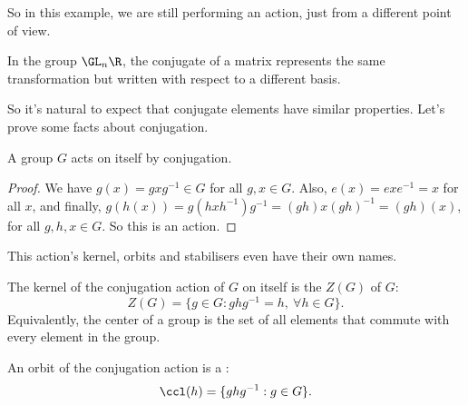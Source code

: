 \begin{example}
\begin{center}

	\end{center}
	So in this example, we are still performing an action, just from a different point of view.
\end{example}

\begin{example}
	In the group $\GL_n \R$, the conjugate of a matrix represents the same transformation but written with respect to a different basis.
\end{example}

So it's natural to expect that conjugate elements have similar properties. Let's prove some facts about conjugation.

\begin{proposition}
	A group $G$ acts on itself by conjugation.
\end{proposition}
\begin{proof}
	We have $g(x) = gxg^{-1} \in G$ for all $g, x \in G$. Also, $e(x) = e x e^{-1} = x$ for all $x$, and finally, $g(h(x)) = g(h xh^{-1})g^{-1} = (gh) x (gh)^{-1} = (gh)(x)$, for all $g, h, x \in G$. So this is an action.
\end{proof}

This action's kernel, orbits and stabilisers even have their own names.

\begin{definition}[Center]
	The kernel of the conjugation action of $G$ on itself is the  $Z(G)$ of $G$:
	$$
Z(G) = \{g \in G : ghg^{-1} = h, \ \forall h \in G\}.
	$$
	Equivalently, the center of a group is the set of all elements that commute with every element in the group.
\end{definition}
\begin{definition}
	An orbit of the conjugation action is a :
	$$
\ccl(h) = \{ ghg^{-1} : g \in G \}.
	$$
\end{definition}

